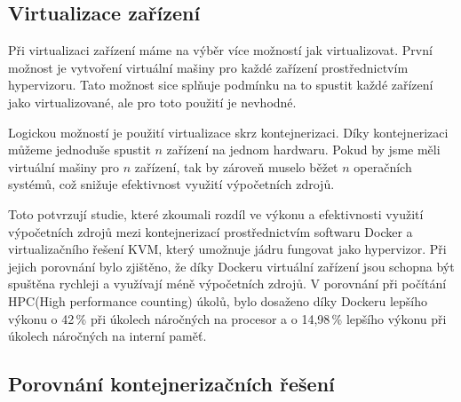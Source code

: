 \subsection{Virtualizace zařízení}

Při virtualizaci zařízení máme na výběr více možností jak virtualizovat. První možnost je vytvoření virtuální mašiny pro každé zařízení prostřednictvím hypervizoru. Tato možnost sice splňuje podmínku na to spustit každé zařízení jako virtualizované, ale pro toto použití je nevhodné. 

Logickou možností je použití virtualizace skrz kontejnerizaci. Díky kontejnerizaci můžeme jednoduše spustit $n$ zařízení na jednom hardwaru. Pokud by jsme měli virtuální mašiny pro $n$ zařízení, tak by zároveň muselo běžet $n$ operačních systémů, což snižuje efektivnost využití výpočetních zdrojů.

Toto potvrzují studie, které zkoumali rozdíl ve výkonu a efektivnosti využití výpočetních zdrojů mezi kontejnerizací prostřednictvím softwaru Docker a virtualizačního řešení KVM, který umožnuje jádru fungovat jako hypervizor. Při jejich porovnání bylo zjištěno, že díky Dockeru virtuální zařízení jsou schopna být spuštěna rychleji a využívají méně výpočetních zdrojů. V porovnání při počítání HPC(High performance counting) úkolů, bylo dosaženo díky Dockeru lepšího výkonu o 42\,\% při úkolech náročných na procesor a o 14,98\,\% lepšího výkonu při úkolech náročných na interní paměť.\cite{kvmdockercomp}\cite{2021virt}


\subsection{Porovnání kontejnerizačních řešení}




